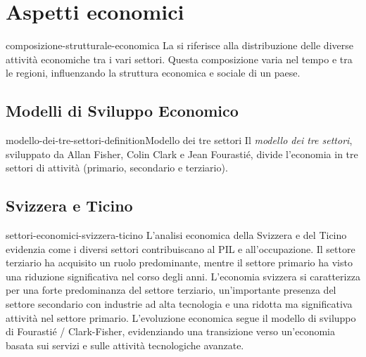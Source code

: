 \documentclass[preview]{standalone}
\begin{document}
\genpage

\section{Aspetti economici}

\begin{snippet}{composizione-strutturale-economica}
    La  si riferisce alla distribuzione delle diverse attività
    economiche tra i vari settori. Questa composizione varia nel tempo e tra le regioni, influenzando la
    struttura economica e sociale di un paese.
\end{snippet}

\subsection{Modelli di Sviluppo Economico}

\begin{snippetdefinition}{modello-dei-tre-settori-definition}{Modello dei tre settori}
    Il \textit{modello dei tre settori}, sviluppato da Allan Fisher, Colin Clark e Jean Fourastié,
    divide l'economia in tre settori di attività (primario, secondario e terziario).
\end{snippetdefinition}


\subsection{Svizzera e Ticino}

\begin{snippet}{settori-economici-svizzera-ticino}
    L'analisi economica della Svizzera e del Ticino evidenzia come i diversi settori
    contribuiscano al PIL e all'occupazione. Il settore terziario ha acquisito un ruolo
    predominante, mentre il settore primario ha visto una riduzione significativa nel corso degli
    anni.
    L'economia svizzera si caratterizza per una forte predominanza del settore terziario, un'importante
    presenza del settore secondario con industrie ad alta tecnologia e una ridotta ma significativa
    attività nel settore primario. L'evoluzione economica segue il modello di sviluppo di Fourastié /
    Clark-Fisher, evidenziando una transizione verso un'economia basata sui servizi e sulle attività
    tecnologiche avanzate.
\end{snippet}
\end{document}
